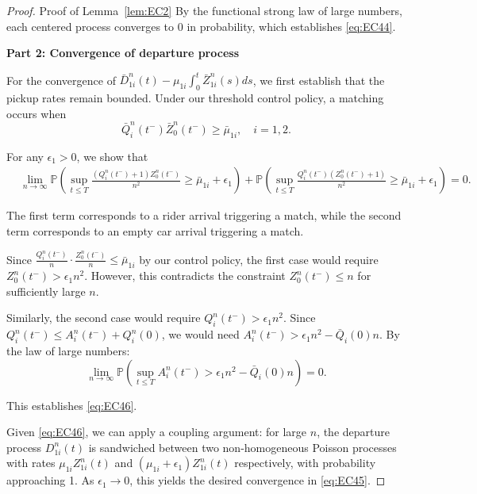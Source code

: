 \begin{proof}{Proof of Lemma~\ref{lem:EC2}}
By the functional strong law of large numbers, each centered process converges to 0 in probability, which establishes \eqref{eq:EC44}.

\textbf{Part 2: Convergence of departure process}

For the convergence of $\bar{D}^n_{1i}(t) - \mu_{1i} \int_0^t \bar{Z}^n_{1i}(s)ds$, we first establish that the pickup rates remain bounded. Under our threshold control policy, a matching occurs when
\begin{equation}
\bar{Q}^n_i(t^-)\bar{Z}^n_0(t^-) \ge \bar{\mu}_{1i}, \quad i = 1,2.
\end{equation}

For any $\epsilon_1 > 0$, we show that
\begin{align}
&\lim_{n \to \infty} \mathbb{P} \left( \sup_{t \le T} \frac{(Q^n_i(t^-)+1)Z^n_0(t^-)}{n^2} \ge \bar{\mu}_{1i} + \epsilon_1 \right)+ \mathbb{P} \left( \sup_{t \le T} \frac{Q^n_i(t^-)(Z^n_0(t^-)+1)}{n^2} \ge \bar{\mu}_{1i} + \epsilon_1 \right) = 0. \label{eq:EC46}
\end{align}

The first term corresponds to a rider arrival triggering a match, while the second term corresponds to an empty car arrival triggering a match. 

Since $\frac{Q^n_i(t^-)}{n} \cdot \frac{Z^n_0(t^-)}{n} \le \bar{\mu}_{1i}$ by our control policy, the first case would require $Z^n_0(t^-) > \epsilon_1 n^2$. However, this contradicts the constraint $Z^n_0(t^-) \le n$ for sufficiently large $n$.

Similarly, the second case would require $Q^n_i(t^-) > \epsilon_1 n^2$. Since $Q^n_i(t^-) \le A^n_i(t^-) + Q^n_i(0)$, we would need $A^n_i(t^-) > \epsilon_1 n^2 - \bar{Q}_i(0)n$. By the law of large numbers:
\begin{equation}
\lim_{n \to \infty} \mathbb{P}\left(\sup_{t \le T} A^n_i(t^-) > \epsilon_1 n^2 - \bar{Q}_i(0)n\right) = 0.
\end{equation}

This establishes \eqref{eq:EC46}.

Given \eqref{eq:EC46}, we can apply a coupling argument: for large $n$, the departure process $D^n_{1i}(t)$ is sandwiched between two non-homogeneous Poisson processes with rates $\mu_{1i} Z^n_{1i}(t)$ and $(\mu_{1i} + \epsilon_1)Z^n_{1i}(t)$ respectively, with probability approaching 1. As $\epsilon_1 \to 0$, this yields the desired convergence in \eqref{eq:EC45}.
\Halmos
\end{proof}


